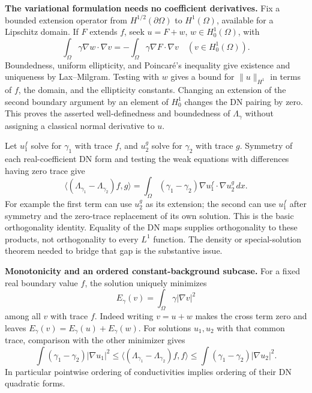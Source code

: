 \documentclass[11pt]{article}
\begin{document}
\textbf{The variational formulation needs no coefficient derivatives.}
Fix a bounded extension operator from $H^{1/2}(\partial\Omega)$ to
$H^1(\Omega)$, available for a Lipschitz domain.  If $F$ extends $f$, seek
$u=F+w$, $w\in H_0^1(\Omega)$, with
\[
 \int_\Omega\gamma\nabla w\cdot\nabla v
 =-\int_\Omega\gamma\nabla F\cdot\nabla v
 \quad(v\in H_0^1(\Omega)).
\]
Boundedness, uniform ellipticity, and Poincar\'e's inequality give existence
and uniqueness by Lax--Milgram.  Testing with $w$ gives a bound for
$\|u\|_{H^1}$ in terms of $f$, the domain, and the ellipticity constants.
Changing an extension of the second boundary argument by an element of
$H_0^1$ changes the DN pairing by zero.  This proves the asserted
well-definedness and boundedness of $\Lambda_\gamma$ without assigning a
classical normal derivative to $u$.

Let $u_1^f$ solve for $\gamma_1$ with trace $f$, and $u_2^g$ solve for
$\gamma_2$ with trace $g$.  Symmetry of each real-coefficient DN form and
testing the weak equations with differences having zero trace give
\[
 \langle(\Lambda_{\gamma_1}-\Lambda_{\gamma_2})f,g\rangle
 =\int_\Omega(\gamma_1-\gamma_2)
                    \nabla u_1^f\cdot\nabla u_2^g\,dx.
\]
For example the first term can use $u_2^g$ as its extension; the second can
use $u_1^f$ after symmetry and the zero-trace replacement of its own solution.
This is the basic orthogonality identity.  Equality of the DN maps supplies
orthogonality to these products, not orthogonality to every $L^1$ function.
The density or special-solution theorem needed to bridge that gap is the
substantive issue.

\textbf{Monotonicity and an ordered constant-background subcase.}
For a fixed real boundary value $f$, the solution uniquely minimizes
\[
 E_\gamma(v)=\int_\Omega\gamma|\nabla v|^2
\]
among all $v$ with trace $f$.  Indeed writing $v=u+w$ makes the cross term
zero and leaves $E_\gamma(v)=E_\gamma(u)+E_\gamma(w)$.
For solutions $u_1,u_2$ with that common trace, comparison with the other
minimizer gives
\[
 \int(\gamma_1-\gamma_2)|\nabla u_1|^2
 \leq\langle(\Lambda_{\gamma_1}-\Lambda_{\gamma_2})f,f\rangle
 \leq\int(\gamma_1-\gamma_2)|\nabla u_2|^2.
\]
In particular pointwise ordering of conductivities implies ordering of their
DN quadratic forms.
\end{document}
